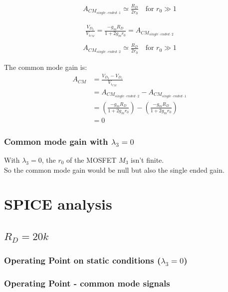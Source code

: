 \begin{align}
A_{CM_{single\cdot ended\cdot 1}} \simeq \frac{R_{D}}{2r_0} \quad \text{for } r_0 \gg 1
\end{align}

\begin{align}
\frac{V_{D_2}}{V_{i_{CM}}} = \frac{-g_m R_{D}}{1+2g_m r_0} = A_{CM_{single\cdot ended\cdot 2}}\\
\end{align}
\begin{align}
A_{CM_{single\cdot ended\cdot 2}} \simeq \frac{R_{D}}{2r_0} \quad \text{for } r_0 \gg 1
\end{align}

The common mode gain is:\\
\begin{align}
A_{CM} &= \frac{V_{D_2} - V_{D_1}}{V_{i_{CM}}}\\
&= A_{CM_{single\cdot ended\cdot 2}} -A_{CM_{single\cdot ended\cdot 1}} \\
&= \left(\frac{-g_m R_{D}}{1+2g_m r_0} \right) - \left(\frac{-g_m R_{D}}{1+2g_m r_0} \right)\\
&= 0
\end{align}

\subsubsection{Common mode gain with $\lambda_3 = 0$}
With $\lambda_3 = 0$, the $r_0$ of the MOSFET $M_3$ isn't finite.\\
So the common mode gain would be null but also the single ended gain.\par

\clearpage
\section{SPICE analysis}
\subsection{$R_D = 20k$}
\subsubsection{Operating Point on static conditions ($\lambda_3 = 0$)}



\subsubsection{Operating Point - common mode signals}



